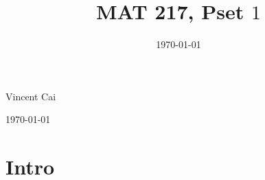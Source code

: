\documentclass[12pt]{amsart}
\title{MAT 217, Pset $1$}
\date{\today}
\theoremstyle{definition}
\theoremstyle{remark}
\begin{document}
\maketitle

\vspace*{-0.25in}
\centerline{Vincent Cai}
\centerline{\today}
\vspace*{0.15in}

\section*{Intro}
\end{document}
